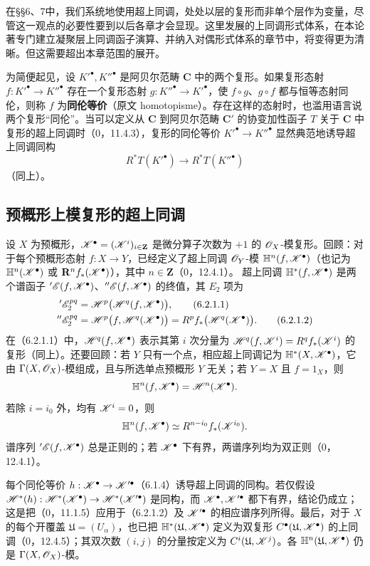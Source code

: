 在§§6、7中，我们系统地使用超上同调，处处以层的复形而非单个层作为变量，尽管这一观点的必要性要到以后各章才会显现。这里发展的上同调形式体系，在本论著专门建立凝聚层上同调函子演算、并纳入对偶形式体系的章节中，将变得更为清晰。但这需要超出本章范围的展开。

为简便起见，设 $K'^\bullet,K''^\bullet$ 是阿贝尔范畴 $\mathbf C$ 中的两个复形。如果复形态射 $f:K'^\bullet\to K''^\bullet$ 存在一个复形态射 $g:K''^\bullet\to K'^\bullet$，使 $f\circ g$、$g\circ f$ 都与恒等态射同伦，则称 $f$ 为\textbf{同伦等价}（原文 homotopisme）。存在这样的态射时，也滥用语言说两个复形“同伦”。当可以定义从 $\mathbf C$ 到阿贝尔范畴 $\mathbf C'$ 的协变加性函子 $T$ 关于 $\mathbf C$ 中复形的超上同调时（0，11.4.3），复形的同伦等价 $K'^\bullet\to K''^\bullet$ 显然典范地诱导超上同调同构
\[
 R^*T(K'^\bullet)\longrightarrow R^*T(K''^\bullet)
\]
（同上）。

\subsection{预概形上模复形的超上同调}
设 $X$ 为预概形，$\mathscr K^\bullet=(\mathscr K^i)_{i\in\mathbf Z}$ 是微分算子次数为 $+1$ 的 $\mathscr O_X$-模复形。回顾：对于每个预概形态射 $f:X\to Y$，已经定义了超上同调 $\mathscr O_Y$-模 $\mathbb H^n(f,\mathscr K^\bullet)$（也记为 $\mathbb H^n(\mathscr K^\bullet)$ 或 $\mathbf R^nf_*(\mathscr K^\bullet)$），其中 $n\in\mathbf Z$（0，12.4.1）。
超上同调 $\mathbb H^*(f,\mathscr K^\bullet)$ 是两个谱函子 ${}'\mathscr E(f,\mathscr K^\bullet)$、${}''\mathscr E(f,\mathscr K^\bullet)$ 的终值，其 $E_2$ 项为
\begin{align}
 {}'\mathscr E_2^{pq}&=\mathscr H^p\bigl(\mathscr H^q(f,\mathscr K^\bullet)\bigr),\tag{6.2.1.1}\\
 {}''\mathscr E_2^{pq}&=\mathscr H^p\bigl(f,\mathscr H^q(\mathscr K^\bullet)\bigr)
 =R^pf_*\bigl(\mathscr H^q(\mathscr K^\bullet)\bigr).\tag{6.2.1.2}
\end{align}
在（6.2.1.1）中，$\mathscr H^q(f,\mathscr K^\bullet)$ 表示其第 $i$ 次分量为
$\mathscr H^q(f,\mathscr K^i)=R^qf_*(\mathscr K^i)$ 的复形（同上）。还要回顾：若 $Y$ 只有一个点，相应超上同调记为 $\mathbb H^*(X,\mathscr K^\bullet)$，它由 $\Gamma(X,\mathscr O_X)$-模组成，且与所选单点预概形 $Y$ 无关；若 $Y=X$ 且 $f=1_X$，则
\[
 \mathbb H^n(f,\mathscr K^\bullet)=\mathscr H^n(\mathscr K^\bullet).
\]
若除 $i=i_0$ 外，均有 $\mathscr K^i=0$，则
\[
 \mathbb H^n(f,\mathscr K^\bullet)\simeq R^{n-i_0}f_*(\mathscr K^{i_0}).
\]
谱序列 ${}'\mathscr E(f,\mathscr K^\bullet)$ 总是正则的；若 $\mathscr K^\bullet$ 下有界，两谱序列均为双正则（0，12.4.1）。

每个同伦等价 $h:\mathscr K^\bullet\to\mathscr K'^\bullet$（6.1.4）诱导超上同调的同构。若仅假设 $\mathscr H^*(h):\mathscr H^*(\mathscr K^\bullet)\to\mathscr H^*(\mathscr K'^\bullet)$ 是同构，而 $\mathscr K^\bullet,\mathscr K'^\bullet$ 都下有界，结论仍成立；这是把（0，11.1.5）应用于（6.2.1.2）及 $\mathscr K'^\bullet$ 的相应谱序列所得。最后，对于 $X$ 的每个开覆盖 $\mathfrak U=(U_\alpha)$，也已把 $\mathbb H^*(\mathfrak U,\mathscr K^\bullet)$ 定义为双复形 $C^\bullet(\mathfrak U,\mathscr K^\bullet)$ 的上同调（0，12.4.5）；其双次数 $(i,j)$ 的分量按定义为 $C^i(\mathfrak U,\mathscr K^j)$。各 $\mathbb H^n(\mathfrak U,\mathscr K^\bullet)$ 仍是 $\Gamma(X,\mathscr O_X)$-模。

